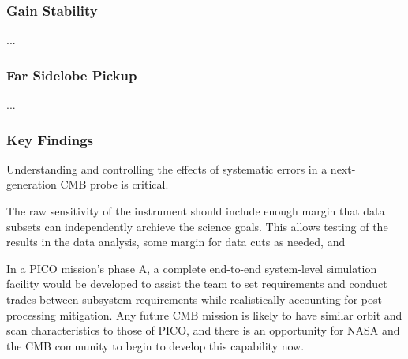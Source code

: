 \documentclass[PICOReport.tex]{subfiles}
\begin{document}
\subsubsection{Gain Stability}
\label{sec:gain}
...

\subsubsection{Far Sidelobe Pickup}
\label{sec:fsl}
...

\subsubsection{Key Findings}
Understanding and controlling the effects of systematic errors in a
next-generation CMB probe is critical.

The raw sensitivity of the instrument should include enough margin
that data subsets can independently archieve the science goals.
This allows testing of the results in the data analysis, some margin
for data cuts as needed, and  

In a PICO mission's phase A, a complete end-to-end system-level
simulation facility would be developed to assist the team to set
requirements and conduct trades between subsystem requirements while
realistically accounting for post-processing mitigation.  Any future
CMB mission is likely to have similar orbit  
and scan characteristics to those of PICO, and there is an opportunity for NASA and
the CMB community to begin to develop this capability now.
\end{document}
